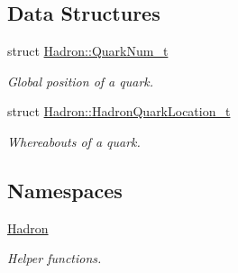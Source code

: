\subsection*{Data Structures}
\begin{DoxyCompactItemize}
\item 
struct \mbox{\hyperlink{structHadron_1_1QuarkNum__t}{Hadron\+::\+Quark\+Num\+\_\+t}}
\begin{DoxyCompactList}\small\item\em Global position of a quark. \end{DoxyCompactList}\item 
struct \mbox{\hyperlink{structHadron_1_1HadronQuarkLocation__t}{Hadron\+::\+Hadron\+Quark\+Location\+\_\+t}}
\begin{DoxyCompactList}\small\item\em Whereabouts of a quark. \end{DoxyCompactList}\end{DoxyCompactItemize}
\subsection*{Namespaces}
\begin{DoxyCompactItemize}
\item 
 \mbox{\hyperlink{namespaceHadron}{Hadron}}
\begin{DoxyCompactList}\small\item\em Helper functions. \end{DoxyCompactList}\end{DoxyCompactItemize}
